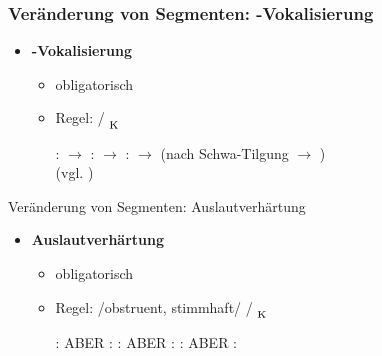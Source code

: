 \begin{frame}
\frametitle{Veränderung von Segmenten: \textipa{/\textscr /}-Vokalisierung}

\begin{itemize}
	\item \textbf{\textipa{/{\textscr}/}-Vokalisierung}
	
	\begin{itemize}
		\item obligatorisch
		\item Regel: \textipa{/{\textscr}/} \ras \textipa{[5]} / \underline{\quad}$_{\textsubscript{K}}$

	\eal
		\ex {}:  $\rightarrow$ \textipa{[Po:\alertred{5}]}
		\ex {}:  $\rightarrow$ \textipa{[fE\alertred{5}n]}
		\ex {}:  $\rightarrow$  (nach Schwa-Tilgung $\rightarrow$ \textipa{[le:.{\textscr}5]})\\
		(vgl.  )
	\zl
	
	\end{itemize}

\end{itemize}

\end{frame}


\begin{frame}{Veränderung von Segmenten: Auslautverhärtung}

\begin{itemize}
	\item \textbf{Auslautverhärtung}

	\begin{itemize}
		\item obligatorisch
		\item Regel: /obstruent, stimmhaft/  / \underline{\quad}$_{\textsubscript{K}}$

	\eal
		\ex {}:  \ras \textipa{[ba:\alertred{t}]}
		\ex ABER :  \ras \textipa{[bE:.\alertblue{d}5]}
		\ex {}:  \ras \textipa{[Po.li:\alertred{f}]}
		\ex ABER :  \ras \textipa{[Po.li:.\alertblue{v}@]}
		\ex {}:  \ras {}
		\ex ABER :  \ras {}
	\zl
	
	\end{itemize}

\end{itemize}

\end{frame}


